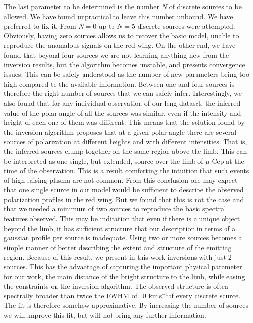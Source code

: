 \documentclass{/Users/art2/TeX/aanda/aa}
\def\kms {km\,s$^{-1}$}
\begin{document}
The last parameter to be determined is the number $N$ of discrete sources to be allowed. We have found unpractical to leave this number unbound. We have preferred to fix it. From $N=0$ up to $N=5$ discrete sources were attempted. Obviously, having zero sources allows us to recover the basic model, unable to reproduce the anomalous signals on the red wing. On the other end, we have found that beyond four sources we are not learning anything new from the inversion results, but the algorithm becomes unstable, and presents convergence issues. This can be safely understood as the number of new parameters being too high compared to the available information.   Between one and four sources is therefore the right number of sources that we can safely infer. Interestingly, we also found that for  any individual  observation of our long dataset, the inferred value of the polar angle of all the sources was similar, even if the intensity and height of each one of them was different. This means that the solution found by the inversion algorithm proposes that at a given polar angle there are several sources of polarization at different heights and with different intensities. That is, the inferred sources clump together on the same region above the limb. This can be interpreted as one single, but extended, source  over the limb of $\mu$ Cep at the time of the observation. This is a result comforting the intuition that such events of high-raising plasma are not common.  From this conclusion one may expect that one single source in our model would be sufficient to describe the observed polarization profiles in the red wing. But we found that this is not the case and that we needed a minimum of two sources to reproduce the basic spectral features observed. This may be indication that even if there is a unique object beyond the limb, it has sufficient structure that our description in terms of a gaussian profile per source is inadequate.  Using two or more sources becomes a simple manner of better describing the extent and structure of the emitting region. Because of this result, we present in this work inversions with just 2 sources. This has the advantage of capturing the important physical parameter for our work, the main distance of the bright structure to the limb,  while easing the constraints on the inversion algorithm. The observed structure is  often spectrally broader than twice the FWHM of 10 \kms of every discrete source. The fit is therefore somehow approximative. By increasing the number of sources we will improve this fit, but will not bring any further information.   
\end{document}
